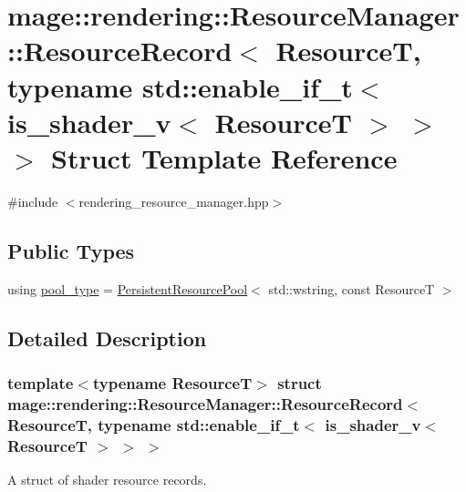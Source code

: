 \hypertarget{structmage_1_1rendering_1_1_resource_manager_1_1_resource_record_3_01_resource_t_00_01typename_09b062ee4b0394619806084252c69f48d}{}\section{mage\+:\+:rendering\+:\+:Resource\+Manager\+:\+:Resource\+Record$<$ ResourceT, typename std\+:\+:enable\+\_\+if\+\_\+t$<$ is\+\_\+shader\+\_\+v$<$ ResourceT $>$ $>$ $>$ Struct Template Reference}
\label{structmage_1_1rendering_1_1_resource_manager_1_1_resource_record_3_01_resource_t_00_01typename_09b062ee4b0394619806084252c69f48d}


{\ttfamily \#include $<$rendering\+\_\+resource\+\_\+manager.\+hpp$>$}

\subsection*{Public Types}
\begin{DoxyCompactItemize}
\item 
using \mbox{\hyperlink{structmage_1_1rendering_1_1_resource_manager_1_1_resource_record_3_01_resource_t_00_01typename_09b062ee4b0394619806084252c69f48d_a1c01c03fc944bfdd0ab9c135770df401}{pool\+\_\+type}} = \mbox{\hyperlink{classmage_1_1_persistent_resource_pool}{Persistent\+Resource\+Pool}}$<$ std\+::wstring, const ResourceT $>$
\end{DoxyCompactItemize}


\subsection{Detailed Description}
\subsubsection*{template$<$typename ResourceT$>$\newline
struct mage\+::rendering\+::\+Resource\+Manager\+::\+Resource\+Record$<$ Resource\+T, typename std\+::enable\+\_\+if\+\_\+t$<$ is\+\_\+shader\+\_\+v$<$ Resource\+T $>$ $>$ $>$}

A struct of shader resource records.



